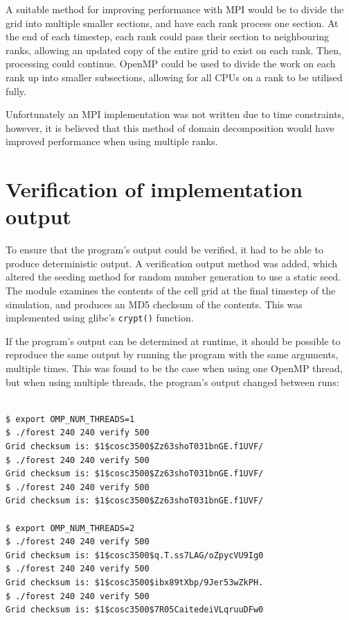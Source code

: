 \documentclass[11pt,a4paper]{report}
\begin{document}
A suitable method for improving performance with MPI would be to divide the
grid into multiple smaller sections, and have each rank process one section. At
the end of each timestep, each rank could pass their section to neighbouring
ranks, allowing an updated copy of the entire grid to exist on each rank. Then,
processing could continue. OpenMP could be used to divide the work on each rank
up into smaller subsections, allowing for all CPUs on a rank to be utilised
fully.

Unfortunately an MPI implementation was not written due to time constraints,
however, it is believed that this method of domain decomposition would have
improved performance when using multiple ranks.


\newpage
\section{Verification of implementation output}

To ensure that the program's output could be verified, it had to be able to
produce deterministic output. A verification output method was added, which
altered the seeding method for random number generation to use a static seed.
The module examines the contents of the cell grid at the final timestep of the
simulation, and produces an MD5 checksum of the contents. This was implemented
using glibc's \texttt{crypt()} function.

If the program's output can be determined at runtime, it should be possible to
reproduce the same output by running the program with the same arguments,
multiple times. This was found to be the case when using one OpenMP thread, but
when using multiple threads, the program's output changed between runs:


\begin{verbatim}

$ export OMP_NUM_THREADS=1
$ ./forest 240 240 verify 500
Grid checksum is: $1$cosc3500$Zz63shoT031bnGE.f1UVF/
$ ./forest 240 240 verify 500
Grid checksum is: $1$cosc3500$Zz63shoT031bnGE.f1UVF/
$ ./forest 240 240 verify 500
Grid checksum is: $1$cosc3500$Zz63shoT031bnGE.f1UVF/

$ export OMP_NUM_THREADS=2
$ ./forest 240 240 verify 500
Grid checksum is: $1$cosc3500$q.T.ss7LAG/oZpycVU9Ig0
$ ./forest 240 240 verify 500
Grid checksum is: $1$cosc3500$ibx89tXbp/9Jer53wZkPH.
$ ./forest 240 240 verify 500
Grid checksum is: $1$cosc3500$7R05CaitedeiVLqruuDFw0

\end{verbatim}
\end{document}
